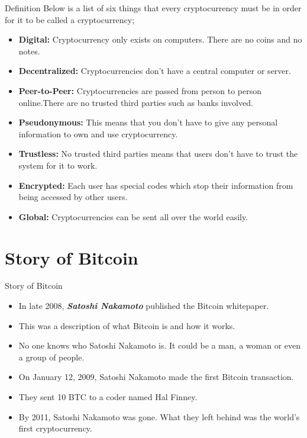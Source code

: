 \documentclass{beamer}
\begin{document}
\begin{frame}{Definition}
    Below is a list of six things that every cryptocurrency must be in order for it to be called a cryptocurrency;
    \begin{itemize}
        \item \textbf{Digital:} Cryptocurrency only exists on computers. There are no coins and no notes. 
        \item \textbf{Decentralized:} Cryptocurrencies don’t have a central computer or server.
        \item \textbf{Peer-to-Peer:} Cryptocurrencies are passed from person to person online.There are no trusted third parties such as banks involved. 
        
    \end{itemize}
    
\end{frame}
\begin{frame}{}
    \begin{itemize}
        \item \textbf{Pseudonymous:} This means that you don’t have to give any personal information to own and use cryptocurrency. 
        \item \textbf{Trustless:} No trusted third parties means that users don’t have to trust the system for it to work. 
        \item \textbf{Encrypted:} Each user has special codes which stop their information from being accessed by other users. 
        \item \textbf{Global:} Cryptocurrencies can be sent all over the world easily.
    \end{itemize}
\end{frame}

\section{Story of Bitcoin}

\begin{frame}{Story of Bitcoin}
    \begin{itemize}
        \item In late 2008, \textit{\textbf{ Satoshi Nakamoto}} published the Bitcoin whitepaper.
        \item This was a description of what Bitcoin is and how it works.
        \item No one knows who Satoshi Nakamoto is. It could be a man, a woman or even a group of people. 
        \item On January 12, 2009, Satoshi Nakamoto made the first Bitcoin transaction. 
        \item They sent 10 BTC to a coder named Hal Finney.
        \item By 2011, Satoshi Nakamoto was gone. What they left behind was the world’s first cryptocurrency.
    \end{itemize}
\end{frame}
\end{document}

